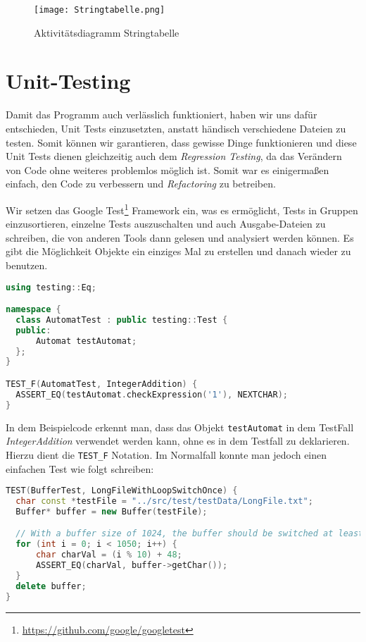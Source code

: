 \begin{figure}[!htb]
    \centering
      \texttt{[image: Stringtabelle.png]}
    \caption{Aktivitätsdiagramm Stringtabelle}\label{fig:stringtabelle}
\end{figure}

\section{Unit-Testing}\label{sec:UnitTests}
Damit das Programm auch verlässlich funktioniert, haben wir uns dafür entschieden, Unit Tests einzusetzten, anstatt händisch verschiedene Dateien zu testen. Somit können wir garantieren, dass gewisse Dinge funktionieren und diese Unit Tests dienen gleichzeitig auch dem \textit{Regression Testing}, da das Verändern von Code ohne weiteres problemlos möglich ist. Somit war es einigermaßen einfach, den Code zu verbessern und \textit{Refactoring} zu betreiben.

Wir setzen das Google Test\footnote{\url{https://github.com/google/googletest}} Framework ein, was es ermöglicht, Tests in Gruppen einzusortieren, einzelne Tests auszuschalten und auch Ausgabe-Dateien zu schreiben, die von anderen Tools dann gelesen und analysiert werden können. Es gibt die Möglichkeit Objekte ein einziges Mal zu erstellen und danach wieder zu benutzen.

\begin{lstlisting}[language=C++]
using testing::Eq;

namespace {
  class AutomatTest : public testing::Test {
  public:
      Automat testAutomat;
  };
}

TEST_F(AutomatTest, IntegerAddition) {
  ASSERT_EQ(testAutomat.checkExpression('1'), NEXTCHAR);
}
\end{lstlisting}

In dem Beispielcode erkennt man, dass das Objekt \texttt{testAutomat} in dem TestFall \emph{IntegerAddition} verwendet werden kann, ohne es in dem Testfall zu deklarieren. Hierzu dient die \texttt{TEST\_F} Notation. Im Normalfall konnte man jedoch einen einfachen Test wie folgt schreiben:

\begin{lstlisting}[language=C++]
TEST(BufferTest, LongFileWithLoopSwitchOnce) {
  char const *testFile = "../src/test/testData/LongFile.txt";
  Buffer* buffer = new Buffer(testFile);

  // With a buffer size of 1024, the buffer should be switched at least once
  for (int i = 0; i < 1050; i++) {
      char charVal = (i % 10) + 48;
      ASSERT_EQ(charVal, buffer->getChar());
  }
  delete buffer;
}
\end{lstlisting}

